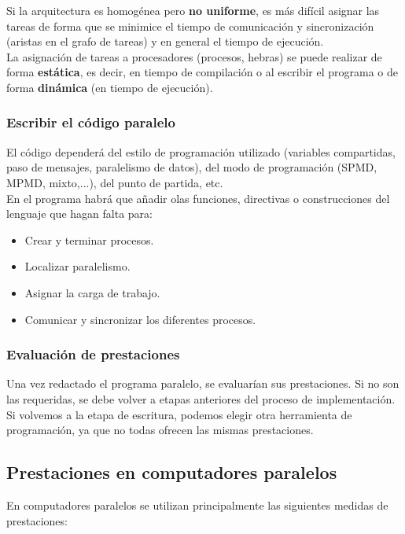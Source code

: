 \documentclass[12pt,spanish]{article}
\begin{document}
Si la arquitectura es homogénea pero \textbf{no uniforme}, es más difícil asignar las tareas de forma que se minimice el tiempo de comunicación y sincronización (aristas en el grafo de tareas) y en general el tiempo de ejecución. \\

La asignación de tareas a procesadores (procesos, hebras) se puede realizar de forma \textbf{estática}, es decir, en tiempo de compilación o al escribir el programa o de forma \textbf{dinámica} (en tiempo de ejecución).


\subsubsection{Escribir el código paralelo}

El código dependerá del estilo de programación utilizado (variables compartidas, paso de mensajes, paralelismo de datos), del modo de programación (SPMD, MPMD, mixto,...), del punto de partida, etc.\\

En el programa habrá que añadir olas funciones, directivas o construcciones del lenguaje que hagan falta para:

\begin{itemize}
	\item Crear y terminar procesos.
	\item Localizar paralelismo.
	\item Asignar la carga de trabajo.
	\item Comunicar y sincronizar los diferentes procesos.
\end{itemize}
\subsubsection{Evaluación de prestaciones}

Una vez redactado el programa paralelo, se evaluarían sus prestaciones. Si no son las requeridas, se debe volver a etapas anteriores del proceso de implementación. Si volvemos a la etapa de escritura, podemos elegir otra herramienta de programación, ya que no todas ofrecen las mismas prestaciones.


\subsection{Prestaciones en computadores paralelos}

En computadores paralelos se utilizan principalmente las siguientes medidas de prestaciones:
\end{document}
